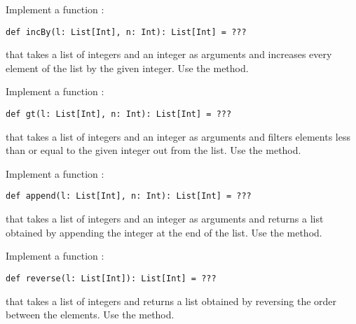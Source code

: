 \begin{exercise}

Implement a function :
\begin{verbatim}
def incBy(l: List[Int], n: Int): List[Int] = ???
\end{verbatim}
that takes a list of integers and an integer as
arguments and increases every element of the list by the given integer. Use
the  method.

\end{exercise}

\begin{exercise}

Implement a function :
\begin{verbatim}
def gt(l: List[Int], n: Int): List[Int] = ???
\end{verbatim}
that takes a list of integers and an integer as arguments
and filters elements less than or equal to the given integer out from the list.
Use the  method.

\end{exercise}

\begin{exercise}

Implement a function :
\begin{verbatim}
def append(l: List[Int], n: Int): List[Int] = ???
\end{verbatim}
that takes a list of integers and an integer as arguments
and returns a list obtained by appending the integer at the end of the list.
Use the  method.

\end{exercise}

\begin{exercise}

Implement a function :
\begin{verbatim}
def reverse(l: List[Int]): List[Int] = ???
\end{verbatim}
that takes a list of integers
and returns a list obtained by reversing the order between the elements.
Use the  method.

\end{exercise}
